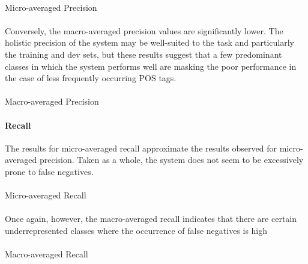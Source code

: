 \documentclass[11pt,a4paper]{article}
\begin{document}
\paragraph{}
{\center\footnotesize Micro-averaged Precision\\}
{\tiny\pgfplotstabletypeset[header=true]{\pmicro}}

\paragraph{}
Conversely, the macro-averaged precision values are significantly lower.
The holistic precision of the system may be well-suited to the task
and particularly the training and dev sets, but these results suggest
that a few predominant classes in which the system performs well
are masking the poor performance in the case of less frequently occurring
POS tags.

\paragraph{}
{\center\footnotesize Macro-averaged Precision\\}
{\tiny\pgfplotstabletypeset[header=true]{\pmacro}}

\paragraph{Recall}
The results for micro-averaged recall approximate the
results observed for micro-averaged precision. Taken as a
whole, the system does not seem to be excessively prone to
false negatives.

\paragraph{}
{\center\footnotesize Micro-averaged Recall\\}
{\tiny\pgfplotstabletypeset[header=true]{\rmicro}}

\paragraph{}
Once again, however, the macro-averaged recall indicates
that there are certain underrepresented classes where the
occurrence of false negatives is high

\paragraph{}
{\center\footnotesize Macro-averaged Recall\\}
{\tiny\pgfplotstabletypeset[header=true]{\rmacro}}
\end{document}
